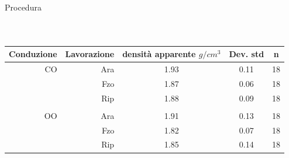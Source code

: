 \begin{frame}{Procedura}
\begin{columns}
{    }
  \end{columns}
\end{frame}



\begin{frame}
  \footnotesize
  \begin{table}[ht]
    \centering
    \begin{tabular}{rrccc}
      \hline
      Conduzione & Lavorazione & densit\`a apparente $g/cm^3$& Dev. std & n \\ 
      \hline
      CO & Ara & 1.93 & 0.11 &  18 \\ 
                 & Fzo & 1.87 & 0.06 &  18 \\ 
                 & Rip & 1.88 & 0.09 &  18 \\ \\
      OO & Ara & 1.91 & 0.13 &  18 \\ 
                 & Fzo & 1.82 & 0.07 &  18 \\ 
                 & Rip & 1.85 & 0.14 &  18 \\ 
      \hline
    \end{tabular}
    \label{tab:RiassuntoDensitaSpinta}
  \end{table}
\end{frame}

